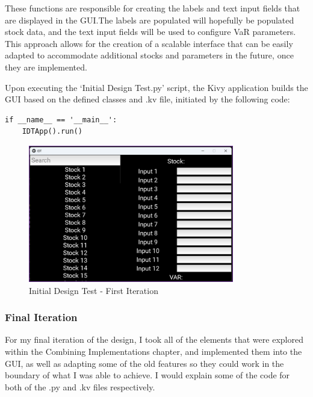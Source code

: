 \documentclass{article}
\begin{document}
These functions are responsible for creating the labels and text input fields that are displayed in the GUI.\@ The labels are populated will hopefully be populated stock data, and the text input fields will be used to configure VaR parameters.  This approach allows for the creation of a scalable interface that can be easily adapted to accommodate additional stocks and parameters in the future, once they are implemented.\\\vspace{0.3cm}

Upon executing the `Initial Design Test.py' script, the Kivy application builds the GUI based on the defined classes and .kv file, initiated by the following code:

\begin{verbatim}
if __name__ == '__main__':
    IDTApp().run()
\end{verbatim}

\begin{figure}[h!]
  \centering
  \includegraphics[width=0.8\textwidth]{Images/Initial Design Test Image 1.png}
  \caption{Initial Design Test - First Iteration}
  \label{fig:Initial Design Test - First Iteration}
\end{figure}

\newpage
\subsubsection{Final Iteration}
For my final iteration of the design, I took all of the elements that were explored within the Combining Implementations chapter, and implemented them into the GUI, as well as adapting some of the old features so they could work in the boundary of what I was able to achieve. I would explain some of the code for both of the .py and .kv files respectively.\@\\\vspace{0.3cm}
\end{document}
